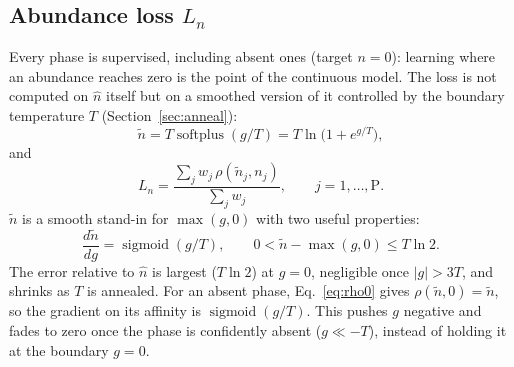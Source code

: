 \documentclass[11pt]{article}
\DeclareMathOperator{\softplus}{softplus}
\begin{document}
\subsection{Abundance loss $L_n$}
Every phase is supervised, including absent ones (target $n=0$): learning where an
abundance reaches zero is the point of the continuous model. The loss is not computed on
$\hat n$ itself but on a smoothed version of it controlled by the boundary temperature
$T$ (Section~\ref{sec:anneal}):
\begin{equation}
  \tilde n = T \softplus(g/T) = T \ln\!\big(1 + e^{g/T}\big),
  \label{eq:smooth}
\end{equation}
and
\begin{equation}
  L_n = \frac{\sum_j w_j\, \rho(\tilde n_j, n_j)}{\sum_j w_j},
  \qquad j = 1,\dots,\text{P}.
\end{equation}
$\tilde n$ is a smooth stand-in for $\max(g,0)$ with two useful properties:
\begin{equation}
  \frac{d\tilde n}{dg} = \operatorname{sigmoid}(g/T),
  \qquad
  0 < \tilde n - \max(g,0) \le T \ln 2 .
  \label{eq:smoothprops}
\end{equation}
The error relative to $\hat n$ is largest ($T\ln 2$) at $g = 0$, negligible once
$|g| > 3T$, and shrinks as $T$ is annealed. For an absent phase, Eq.~\eqref{eq:rho0} gives
$\rho(\tilde n, 0) = \tilde n$, so the gradient on its affinity is
$\operatorname{sigmoid}(g/T)$. This pushes $g$ negative and fades to zero once the phase
is confidently absent ($g \ll -T$), instead of holding it at the boundary $g=0$.
\end{document}
